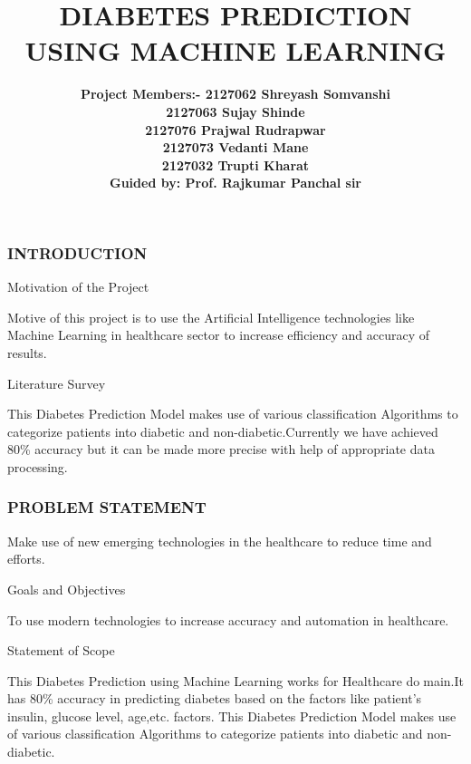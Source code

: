 \documentclass{beamer}
\title[Diabetes Prediction using ML]{DIABETES PREDICTION USING MACHINE LEARNING} %
\author[Shreyash Somvanshi]{
\bf Project Members:-
  \bf 2127062 Shreyash Somvanshi\\\medskip
  \bf 2127063 Sujay Shinde\\\medskip
  \bf 2127076 Prajwal Rudrapwar\\\medskip
  \bf 2127073 Vedanti Mane\\\medskip
  \bf 2127032 Trupti Kharat\\\medskip
  \bf Guided by: Prof. Rajkumar Panchal sir
  }
\institute[VPKBIET] %
{
{
  Department of Artificial Intelligence $\&$ Data Science\\ Vidya Pratishthan's Kamalnayan Bajaj Institute of College and Technology\\
  Vidyanagari, Baramati-413133} \\ %
\medskip
}
\date{} %
\begin{document}
\begin{frame}[plain]
  \titlepage
\end{frame}


\begin{frame}
  \frametitle{\bf INTRODUCTION}
  \begin{block}
    {}
    Motivation of the Project
  \end{block}
  \normalsize{Motive of this project is to use the Artificial Intelligence technologies like Machine Learning in healthcare sector to increase efficiency and accuracy of results.
}
  \begin{block}
    {}
    Literature Survey
  \end{block}
  \normalsize{This Diabetes Prediction Model makes use of various classification Algorithms to categorize patients into diabetic and non-diabetic.Currently we have achieved 80\% accuracy but it can be made more precise  with help of appropriate data processing.
}
\end{frame}

\begin{frame}
  \frametitle{\bf PROBLEM STATEMENT}
  Make use of new emerging technologies in the healthcare to reduce time and efforts.
  \begin{block}
    {}
    Goals and Objectives
  \end{block}
  \normalsize{To use modern technologies to increase accuracy and automation in healthcare.}
  \begin{block}
    {}
    Statement of Scope
  \end{block}
  \normalsize{This Diabetes Prediction using Machine Learning works for Healthcare domain.It has 80\% accuracy in predicting diabetes based on the factors like patient’s insulin, glucose level, age,etc. factors. This Diabetes Prediction Model makes use of various classification Algorithms to categorize patients into diabetic and non-diabetic.
}
\end{frame}
\end{document}
